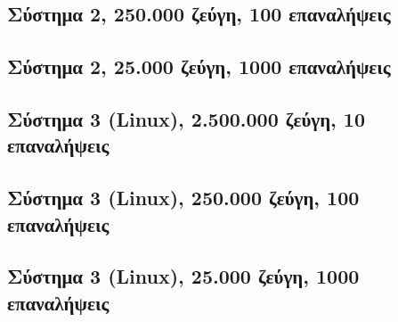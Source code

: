 \subsection*{Σύστημα 2, 250.000 ζεύγη, 100 επαναλήψεις}\begin{center}
\tabcolsep=0.11cm
\scalebox{0.5}{
}
\scalebox{0.9}{
}\end{center}
\newpage

\subsection*{Σύστημα 2, 25.000 ζεύγη, 1000 επαναλήψεις}\begin{center}
\tabcolsep=0.11cm
\scalebox{0.5}{
}
\scalebox{0.9}{
}\end{center}
\newpage

\subsection*{Σύστημα 3 (Linux), 2.500.000 ζεύγη, 10 επαναλήψεις}
\begin{center}
\tabcolsep=0.11cm
\scalebox{0.55}{}
\scalebox{0.9}{
}\end{center}
\newpage

\subsection*{Σύστημα 3 (Linux), 250.000 ζεύγη, 100 επαναλήψεις}\begin{center}
\tabcolsep=0.11cm
\scalebox{0.5}{
}
\scalebox{0.9}{
}\end{center}
\newpage

\subsection*{Σύστημα 3 (Linux), 25.000 ζεύγη, 1000 επαναλήψεις}\begin{center}
\tabcolsep=0.11cm
\scalebox{0.5}{
}
\scalebox{0.9}{
}\end{center}
\newpage


